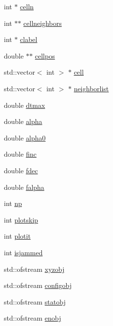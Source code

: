 \begin{DoxyCompactItemize}
\item 
int $\ast$ \mbox{\hyperlink{classpacking_ae917ff801cb46aad3cb68a44acce4020}{celln}}
\item 
int $\ast$$\ast$ \mbox{\hyperlink{classpacking_a644c3ce4ed2caba0c84f30af9f7d58a8}{cellneighbors}}
\item 
int $\ast$ \mbox{\hyperlink{classpacking_a3610364abb17fe2c0bacec06e05d9123}{clabel}}
\item 
double $\ast$$\ast$ \mbox{\hyperlink{classpacking_a4b3af5f349b64a433c53382610fb6563}{cellpos}}
\item 
std\+::vector$<$ int $>$ $\ast$ \mbox{\hyperlink{classpacking_a5c104fd62aea53bee075d978dd6d9d6a}{cell}}
\item 
std\+::vector$<$ int $>$ $\ast$ \mbox{\hyperlink{classpacking_a4ef3865ec63508098d2957022fe11b8f}{neighborlist}}
\item 
double \mbox{\hyperlink{classpacking_ae4a4b73d1937c50d564cd71886d17fab}{dtmax}}
\item 
double \mbox{\hyperlink{classpacking_a9683c4c16704f81b0086a7639f030953}{alpha}}
\item 
double \mbox{\hyperlink{classpacking_afa09f18e29cec06705f33a5253f1b016}{alpha0}}
\item 
double \mbox{\hyperlink{classpacking_ac67189efe0f5c00878074d9e1a6fd80a}{finc}}
\item 
double \mbox{\hyperlink{classpacking_a2188035c9e34ec7f636822e83e785513}{fdec}}
\item 
double \mbox{\hyperlink{classpacking_a6bd8393eedd89fe3082be57be371dbaf}{falpha}}
\item 
int \mbox{\hyperlink{classpacking_a2e20ad3bfc90e5c328dddd7da34291e1}{np}}
\item 
int \mbox{\hyperlink{classpacking_aa88ec1647a3bdcf9c3cc03ea03257c1b}{plotskip}}
\item 
int \mbox{\hyperlink{classpacking_a495864a18a5eeef957d7a1bc3d3eb2bd}{plotit}}
\item 
int \mbox{\hyperlink{classpacking_a8a79180aa5d7bd8faa6d048f036f5d2b}{isjammed}}
\item 
std\+::ofstream \mbox{\hyperlink{classpacking_a8c37b117034cced906a5232358752725}{xyzobj}}
\item 
std\+::ofstream \mbox{\hyperlink{classpacking_af156dc6a748d6330d8d058d7b623f33e}{configobj}}
\item 
std\+::ofstream \mbox{\hyperlink{classpacking_a7d70ed77edfe21649b824f01d26432d0}{statobj}}
\item 
std\+::ofstream \mbox{\hyperlink{classpacking_acc65e17d00c4ae7ed3efee0da9693144}{enobj}}
\end{DoxyCompactItemize}


